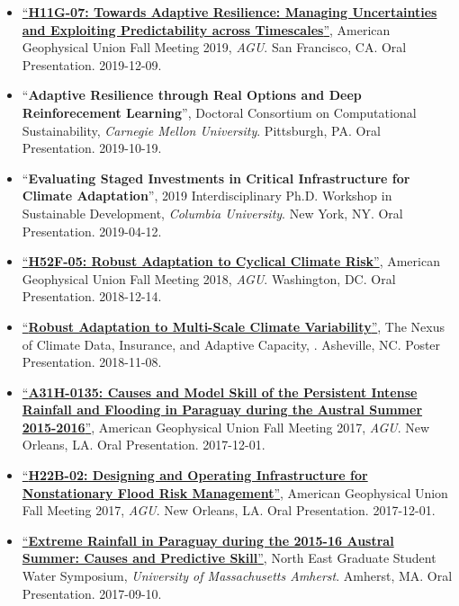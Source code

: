 \documentclass[10pt,oneside]{article}
\begin{document}
\begin{itemize}[label={}]
  \item \href{https://figshare.com/articles/Towards_Adaptive_Resilience_Managing_uncertainties_and_exploiting_predictability_across_timescales/11397936}{\enquote{\textbf{H11G-07: Towards Adaptive Resilience: Managing Uncertainties and Exploiting Predictability across Timescales}}}, American Geophysical Union Fall Meeting 2019,  \textit{AGU}. San Francisco, CA. Oral Presentation. 2019-12-09.
  
  \item \enquote{\textbf{Adaptive Resilience through Real Options and Deep Reinforecement Learning}}, Doctoral Consortium on Computational Sustainability,  \textit{Carnegie Mellon University}. Pittsburgh,  PA. Oral Presentation. 2019-10-19.
  
  \item \enquote{\textbf{Evaluating Staged Investments in Critical Infrastructure for Climate Adaptation}}, 2019 Interdisciplinary Ph.D. Workshop in Sustainable Development,  \textit{Columbia University}. New York, NY. Oral Presentation. 2019-04-12.
  
  \item \href{https://agu.confex.com/agu/fm18/meetingapp.cgi/Paper/440508}{\enquote{\textbf{H52F-05: Robust Adaptation to Cyclical Climate Risk}}}, American Geophysical Union Fall Meeting 2018,  \textit{AGU}. Washington, DC. Oral Presentation. 2018-12-14.
  
  \item \href{https://doi.org/10.6084/m9.figshare.8277002.v1}{\enquote{\textbf{Robust Adaptation to Multi-Scale Climate Variability}}}, The Nexus of Climate Data, Insurance, and Adaptive Capacity,  . Asheville, NC. Poster Presentation. 2018-11-08.
  
  \item \href{https://agu.confex.com/agu/fm17/meetingapp.cgi/Paper/299087}{\enquote{\textbf{A31H-0135: Causes and Model Skill of the Persistent Intense Rainfall and Flooding in Paraguay during the Austral Summer 2015-2016}}}, American Geophysical Union Fall Meeting 2017,  \textit{AGU}. New Orleans, LA. Oral Presentation. 2017-12-01.
  
  \item \href{https://agu.confex.com/agu/fm17/meetingapp.cgi/Paper/241469}{\enquote{\textbf{H22B-02: Designing and Operating Infrastructure for Nonstationary Flood Risk Management}}}, American Geophysical Union Fall Meeting 2017,  \textit{AGU}. New Orleans, LA. Oral Presentation. 2017-12-01.
  
  \item \href{https://doi.org/10.6084/m9.figshare.8277128.v2}{\enquote{\textbf{Extreme Rainfall in Paraguay during the 2015-16 Austral Summer: Causes and Predictive Skill}}}, North East Graduate Student Water Symposium,  \textit{University of Massachusetts Amherst}. Amherst, MA. Oral Presentation. 2017-09-10.
  

\end{itemize}
\end{document}
